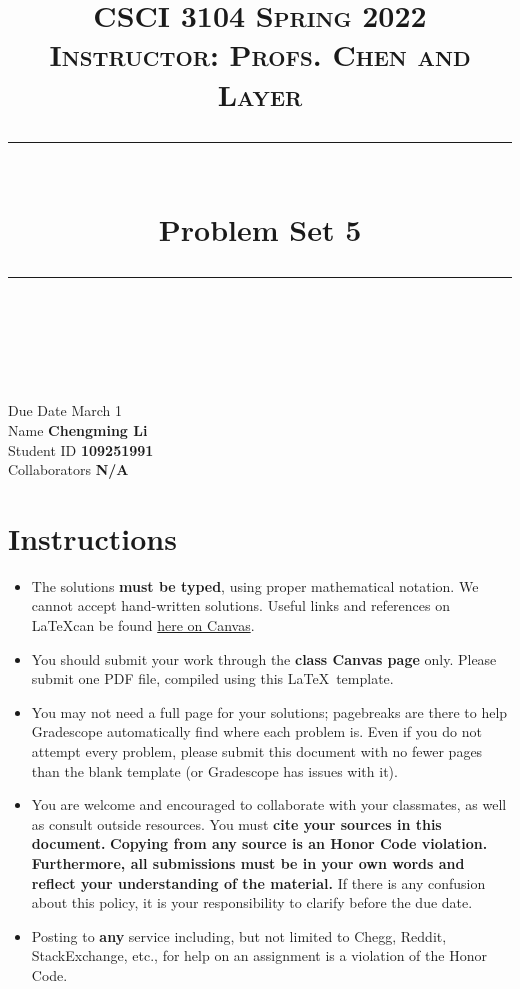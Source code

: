 \documentclass[11pt]{article}
\title{
\normalfont \normalsize 
\textsc{CSCI 3104 Spring 2022 \\ 
Instructor: Profs. Chen and Layer} \\
[10pt] 
\rule{\linewidth}{0.5pt} \\[6pt] 
\huge Problem Set 5 \\
\rule{\linewidth}{2pt}  \\[10pt]
}
\date{}
\theoremstyle{definition}
\theoremstyle{definition}
\theoremstyle{definition}
\begin{document}
\maketitle


\noindent
Due Date \dotfill March 1 \\
Name \dotfill \textbf{Chengming Li} \\
Student ID \dotfill \textbf{109251991} \\
Collaborators \dotfill \textbf{N/A}

\tableofcontents

\section*{Instructions}
 \begin{itemize}
	\item The solutions \textbf{must be typed}, using proper mathematical notation. We cannot accept hand-written solutions. Useful links and references on \LaTeX can be found \href{https://canvas.colorado.edu/courses/75824/pages/latex}{here on Canvas}.
	\item You should submit your work through the \textbf{class Canvas page} only. Please submit one PDF file, compiled using this \LaTeX \ template.
	\item You may not need a full page for your solutions; pagebreaks are there to help Gradescope automatically find where each problem is. Even if you do not attempt every problem, please submit this document with no fewer pages than the blank template (or Gradescope has issues with it).

	\item You are welcome and encouraged to collaborate with your classmates, as well as consult outside resources. You must \textbf{cite your sources in this document.} \textbf{Copying from any source is an Honor Code violation. Furthermore, all submissions must be in your own words and reflect your understanding of the material.} If there is any confusion about this policy, it is your responsibility to clarify before the due date. 

	\item Posting to \textbf{any} service including, but not limited to Chegg, Reddit, StackExchange, etc., for help on an assignment is a violation of the Honor Code.

\end{itemize}
\end{document}

